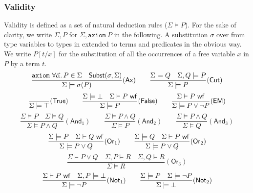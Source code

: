 \documentclass[a4paper,12pt]{report}
\begin{document}
\subsubsection{Validity}

Validity is defined as a set of natural deduction rules
($\Sigma\models P$). For the sake of clarity, 
we write $\Sigma,P$ for $\Sigma,\texttt{axiom}~P$ in the following.
A substitution $\sigma$ over from type variables to types in extended
to terms and predicates in the obvious way. We write $P[t/x]$ for the
substitution of all the occurrences of a free variable $x$ in $P$ by a
term $t$. 
\begin{displaymath}
  \frac{\texttt{axiom}~\forall\vec{\alpha}.\,P\in\Sigma \quad
        \mathsf{Subst}(\sigma,\Sigma)}
       {\Sigma\models\sigma(P)}(\mathsf{Ax})
  \qquad
  \frac{\Sigma\models Q \quad 
        \Sigma,Q\models P}
       {\Sigma\models P}(\mathsf{Cut})
\end{displaymath}
\begin{displaymath}
  \frac{}{\Sigma\models\top}(\mathsf{True})
  \qquad
  \frac{\Sigma\models\bot \quad \Sigma\vdash P~\mathsf{wf}}
       {\Sigma\models P}(\mathsf{False})
  \qquad
  \frac{\Sigma\vdash P~\mathsf{wf}}{\Sigma\models P\lor\lnot P}(\mathsf{EM})
\end{displaymath}
\begin{displaymath}
  \frac{\Sigma\models P \quad \Sigma\models Q}
       {\Sigma\models P\land Q}(\mathsf{And}_1)
  \qquad
  \frac{\Sigma\models P\land Q}
       {\Sigma\models P}(\mathsf{And}_2)
  \qquad
  \frac{\Sigma\models P\land Q}
       {\Sigma\models Q}(\mathsf{And}_3)
\end{displaymath}
\begin{displaymath}
  \frac{\Sigma\models P \quad \Sigma\vdash Q~\mathsf{wf}}
       {\Sigma\models P\lor Q}(\mathsf{Or}_1)
  \qquad
  \frac{\Sigma\models Q \quad \Sigma\vdash P~\mathsf{wf}}
       {\Sigma\models P\lor Q}(\mathsf{Or}_2)
\end{displaymath}
\begin{displaymath}
  \frac{\Sigma\models P\lor Q \quad
        \Sigma,P\models R \quad \Sigma,Q\models R}
       {\Sigma\models R}(\mathsf{Or}_3)
\end{displaymath}
\begin{displaymath}
  \frac{\Sigma\vdash P~\mathsf{wf} \quad \Sigma,P\models\bot}
       {\Sigma\models\lnot P}(\mathsf{Not}_1)
  \qquad
  \frac{\Sigma\models P \quad \Sigma\models\lnot P}
       {\Sigma\models\bot}(\mathsf{Not}_2)
\end{displaymath}
\end{document}
